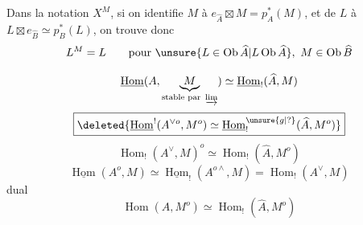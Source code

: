 Dans la notation $X^M$, si on identifie $M$ à $e_{\widehat A}\boxtimes M=p_A^*(M)$, et de  $L$ à $L\boxtimes e_{\widehat B}\simeq p_B^*(L)$, on trouve donc
\[
L^M=L\qquad\text{pour }\unsure{L\in\operatorname{Ob}\widehat A|L\operatorname{Ob}\widehat A},\ M\in\operatorname{Ob}\widehat B
\]

\[
\underline{\operatorname{Hom}}(A,\underbrace{M}_{\text{stable par }\varinjlim})\simeq\underline{\operatorname{Hom}}_!(\widehat A,M)
\]
\[
\boxed{\deleted{\underline{\operatorname{Hom}}^!(A^{\vee o},M^o)\simeq\underline{\operatorname{Hom}}_!^{\unsure{g|?}}(\widehat A,M^o)}}
\]
\[
\operatorname{Hom}_!(A^\vee,M)^o\simeq\operatorname{Hom}_!(\widehat A,M^o)
\]
\[
\underline{\operatorname{Hom}}(A^o,M)\simeq\underline{\operatorname{Hom}}_!(A^{o\wedge},M)=\operatorname{Hom}_!(A^\vee,M)
\]
dual
\[\operatorname{Hom}(A,M^o)\simeq\operatorname{Hom}_!(\widehat A,M^o)\]
